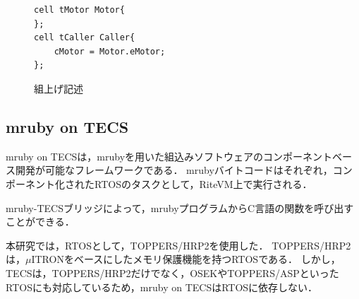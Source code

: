 \documentclass[submit,techrep]{ipsj}
\begin{document}
\begin{figure}[t]
\centering
\begin{lstlisting}
cell tMotor Motor{
};
cell tCaller Caller{
    cMotor = Motor.eMotor;
};
\end{lstlisting}
    \vspace{-2mm}
\caption{組上げ記述}
\vspace{-4mm}
\label{build}
\end{figure}

\vspace{-5mm} 
\subsection{mruby on TECS}
\label{sec:mruby on TECS}
mruby on TECSは，mrubyを用いた組込みソフトウェアのコンポーネントベース開発が可能なフレームワークである．
mrubyバイトコードはそれぞれ，コンポーネント化されたRTOSのタスクとして，RiteVM上で実行される．

mruby-TECSブリッジによって，mrubyプログラムからC言語の関数を呼び出すことができる．

本研究では，RTOSとして，TOPPERS/HRP2\cite{par:hr-tecs}を使用した．
TOPPERS/HRP2は，$\mu$ITRON\cite{par:microITRON}をベースにしたメモリ保護機能を持つRTOSである．
しかし，TECSは，TOPPERS/HRP2だけでなく，OSEK\cite{par:OSEK}やTOPPERS/ASP\cite{url:ASP}といったRTOSにも対応しているため，mruby on TECSはRTOSに依存しない．

\end{document}
